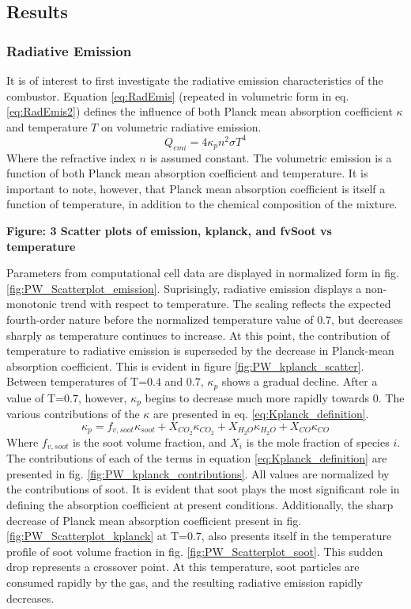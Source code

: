 \subsection{Results}

\subsubsection{Radiative Emission}
It is of interest to first investigate the radiative emission characteristics of the combustor.
Equation \ref{eq:RadEmis} (repeated in volumetric form in eq. \ref{eq:RadEmis2}) defines the influence of both Planck mean absorption coefficient $\kappa{}$ and temperature $T$ on volumetric radiative emission.
\begin{equation}
    Q_{emi}=4\kappa{}_{p}n^2\sigma{}T^4
    \label{eq:RadEmis2}
\end{equation}
Where the refractive index $n$ is assumed constant. 
The volumetric emission is a function of both Planck mean absorption coefficient and temperature. It is important to note, however, that Planck mean absorption coefficient is itself a function of temperature, in addition to the chemical composition of the mixture. 

\textbf{\checkmark Figure: 3 Scatter plots of emission, kplanck, and fvSoot vs temperature}

Parameters from computational cell data are displayed in normalized form in fig. \ref{fig:PW_Scatterplot_emission}. 
Suprisingly, radiative emission displays a non-monotonic trend with respect to temperature. The scaling reflects the expected fourth-order nature before the normalized temperature value of $0.7$, but decreases sharply as temperature continues to increase.
At this point, the contribution of temperature to radiative emission is superseded by the decrease in Planck-mean absorption coefficient.
This is evident in figure \ref{fig:PW_kplanck_scatter}.
Between temperatures of T=$0.4$ and $0.7$, $\kappa{}_p$ shows a gradual decline. After a value of T=$0.7$, however, $\kappa{}_{p}$ begins to decrease much more rapidly towards $0$. 
The various contributions of the $\kappa{}$ are presented in eq. \ref{eq:Kplanck_definition}.
\begin{equation}
    \kappa{}_p=f_{v,soot}\kappa{}_{soot}+X_{CO_2}\kappa{}_{CO_2}+X_{H_2O}\kappa{}_{H_2O}+X_{CO}\kappa{}_{CO}
    \label{eq:Kplanck_definition}
\end{equation}
Where $f_{v,soot}$ is the soot volume fraction, and $X_i$ is the mole fraction of species $i$.
The contributions of each of the terms in equation \ref{eq:Kplanck_definition} are presented in fig. \ref{fig:PW_kplanck_contributions}. All values are normalized by the contributions of soot.
It is evident that soot plays the most significant role in defining the absorption coefficient at present conditions. Additionally, the sharp decrease of Planck mean absorption coefficient present in fig. \ref{fig:PW_Scatterplot_kplanck} at T=$0.7$, also presents itself in the temperature profile of soot volume fraction in fig. \ref{fig:PW_Scatterplot_soot}.
This sudden drop represents a crossover point. At this temperature, soot particles are consumed rapidly by the gas, and the resulting radiative emission rapidly decreases.

